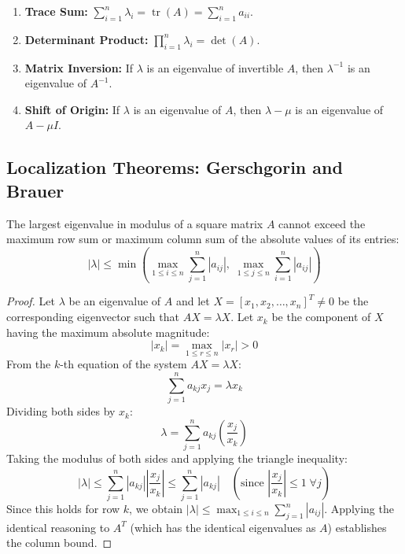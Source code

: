 \documentclass[11pt,a4paper]{article}
\begin{document}
\begin{remarkbox}
\begin{enumerate}
    \item \textbf{Trace Sum:} $\sum_{i=1}^n \lambda_i = \operatorname{tr}(A) = \sum_{i=1}^n a_{ii}$.
    \item \textbf{Determinant Product:} $\prod_{i=1}^n \lambda_i = \det(A)$.
    \item \textbf{Matrix Inversion:} If $\lambda$ is an eigenvalue of invertible $A$, then $\lambda^{-1}$ is an eigenvalue of $A^{-1}$.
    \item \textbf{Shift of Origin:} If $\lambda$ is an eigenvalue of $A$, then $\lambda - \mu$ is an eigenvalue of $A - \mu I$.
\end{enumerate}
\end{remarkbox}

\subsection{Localization Theorems: Gerschgorin and Brauer}

\begin{theorembox}
The largest eigenvalue in modulus of a square matrix $A$ cannot exceed the maximum row sum or maximum column sum of the absolute values of its entries:
\begin{equation}
    |\lambda| \le \min\left( \max_{1 \le i \le n} \sum_{j=1}^n |a_{ij}|, \; \max_{1 \le j \le n} \sum_{i=1}^n |a_{ij}| \right)
\end{equation}
\end{theorembox}

\begin{proof}
Let $\lambda$ be an eigenvalue of $A$ and let $X = [x_1, x_2, \dots, x_n]^T \ne 0$ be the corresponding eigenvector such that $AX = \lambda X$.
Let $x_k$ be the component of $X$ having the maximum absolute magnitude:
$$|x_k| = \max_{1 \le r \le n} |x_r| > 0$$
From the $k$-th equation of the system $AX = \lambda X$:
$$\sum_{j=1}^n a_{kj} x_j = \lambda x_k$$
Dividing both sides by $x_k$:
$$\lambda = \sum_{j=1}^n a_{kj} \left(\frac{x_j}{x_k}\right)$$
Taking the modulus of both sides and applying the triangle inequality:
$$|\lambda| \le \sum_{j=1}^n |a_{kj}| \left|\frac{x_j}{x_k}\right| \le \sum_{j=1}^n |a_{kj}| \quad \left(\text{since } \left|\frac{x_j}{x_k}\right| \le 1 \;\forall j\right)$$
Since this holds for row $k$, we obtain $|\lambda| \le \max_{1 \le i \le n} \sum_{j=1}^n |a_{ij}|$.
Applying the identical reasoning to $A^T$ (which has the identical eigenvalues as $A$) establishes the column bound.
\end{proof}
\end{document}
